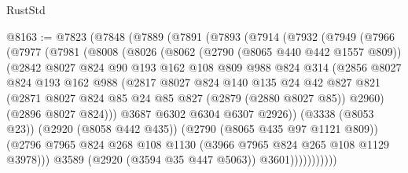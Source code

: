\begin{lexlean}{RustStd}
\begin{coremodule}
@8163 := @7823
    (@7848
      (@7889
        (@7891
          (@7893
            (@7914
              (@7932
                (@7949
                  (@7966
                    (@7977
                      (@7981
                        (@8008
                          (@8026
                            (@8062
                              (@2790 (@8065 @440 @442 @1557 @809))
                              (@2842
                                @8027
                                @824
                                @90
                                @193
                                @162
                                @108
                                @809
                                @988
                                @824
                                @314
                                (@2856
                                  @8027
                                  @824
                                  @193
                                  @162
                                  @988
                                  (@2817
                                    @8027
                                    @824
                                    @140
                                    @135
                                    @24
                                    @42
                                    @827
                                    @821
                                    (@2871
                                      @8027
                                      @824
                                      @85
                                      @24
                                      @85
                                      @827
                                      (@2879 (@2880 @8027 @85))
                                      @2960)
                                    (@2896 @8027 @824)))
                                @3687
                                @6302
                                @6304
                                @6307
                                @2926))
                            (@3338 (@8053 @23))
                            (@2920 (@8058 @442 @435))
                            (@2790 (@8065 @435 @97 @1121 @809))
                            (@2796
                              @7965
                              @824
                              @268
                              @108
                              @1130
                              (@3966 @7965 @824 @265 @108 @1129 @3978)))
                          @3589
                          (@2920 (@3594 @35 @447 @5063))
                          @3601)))))))))))

\end{coremodule}
\end{lexlean}
